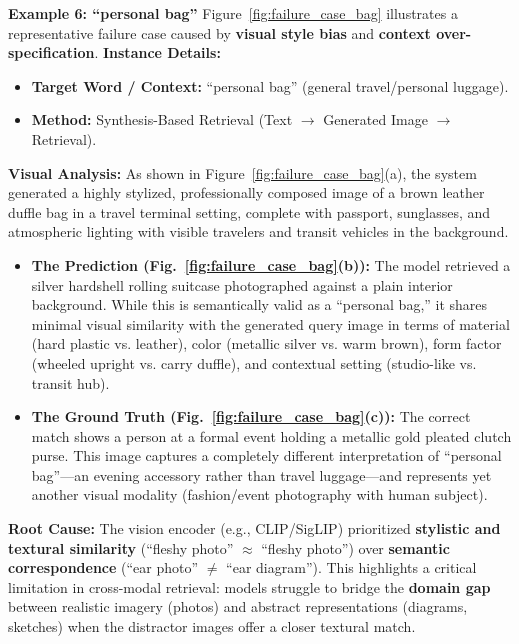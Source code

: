 \documentclass[11pt]{article}
\begin{document}
\textbf{Example 6: ``personal bag''}
\label{sec:failure_style_bias}
Figure~\ref{fig:failure_case_bag} illustrates a representative failure case caused by \textbf{visual style bias} and \textbf{context over-specification}.
\textbf{Instance Details:}
\begin{itemize}
    \item \textbf{Target Word / Context:} ``personal bag'' (general travel/personal luggage).
    \item \textbf{Method:} Synthesis-Based Retrieval (Text $\rightarrow$ Generated Image $\rightarrow$ Retrieval).
\end{itemize}

\textbf{Visual Analysis:}
As shown in Figure~\ref{fig:failure_case_bag}(a), the system generated a highly stylized, professionally composed image of a brown leather duffle bag in a travel terminal setting, complete with passport, sunglasses, and atmospheric lighting with visible travelers and transit vehicles in the background.
\begin{itemize}
\item \textbf{The Prediction (Fig.~\ref{fig:failure_case_bag}(b)):} The model retrieved a silver hardshell rolling suitcase photographed against a plain interior background. While this is semantically valid as a ``personal bag,'' it shares minimal visual similarity with the generated query image in terms of material (hard plastic vs. leather), color (metallic silver vs. warm brown), form factor (wheeled upright vs. carry duffle), and contextual setting (studio-like vs. transit hub).
\item \textbf{The Ground Truth (Fig.~\ref{fig:failure_case_bag}(c)):} The correct match shows a person at a formal event holding a metallic gold pleated clutch purse. This image captures a completely different interpretation of ``personal bag''—an evening accessory rather than travel luggage—and represents yet another visual modality (fashion/event photography with human subject).
\end{itemize}

\textbf{Root Cause:}
The vision encoder (e.g., CLIP/SigLIP) prioritized \textbf{stylistic and textural similarity} (``fleshy photo'' $\approx$ ``fleshy photo'') over \textbf{semantic correspondence} (``ear photo'' $\neq$ ``ear diagram''). This highlights a critical limitation in cross-modal retrieval: models struggle to bridge the \textbf{domain gap} between realistic imagery (photos) and abstract representations (diagrams, sketches) when the distractor images offer a closer textural match.
\end{document}
